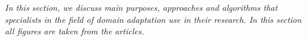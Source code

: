 \textit{In this section, we discuss main purposes, approaches and algorithms that specialists in the field of domain adaptation use in their research. In this section all figures are taken from the articles.}\\















